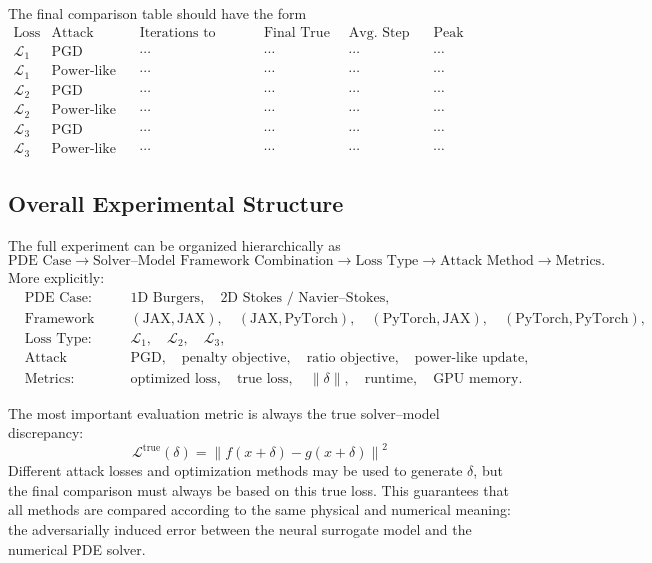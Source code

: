 \documentclass{article}
\begin{document}
The final comparison table should have the form
\[
\begin{array}{c|c|c|c|c|c}
\text{Loss}
&
\text{Attack Method}
&
\text{Iterations to Threshold}
&
\text{Final True Loss}
&
\text{Avg. Step Time}
&
\text{Peak Memory}
\\
\hline
\mathcal{L}_1
&
\text{PGD}
&
\cdots
&
\cdots
&
\cdots
&
\cdots
\\
\mathcal{L}_1
&
\text{Power-like}
&
\cdots
&
\cdots
&
\cdots
&
\cdots
\\
\mathcal{L}_2
&
\text{PGD}
&
\cdots
&
\cdots
&
\cdots
&
\cdots
\\
\mathcal{L}_2
&
\text{Power-like}
&
\cdots
&
\cdots
&
\cdots
&
\cdots
\\
\mathcal{L}_3
&
\text{PGD}
&
\cdots
&
\cdots
&
\cdots
&
\cdots
\\
\mathcal{L}_3
&
\text{Power-like}
&
\cdots
&
\cdots
&
\cdots
&
\cdots
\end{array}
\]

\subsection{Overall Experimental Structure}

The full experiment can be organized hierarchically as
\[
\text{PDE Case}
\rightarrow
\text{Solver--Model Framework Combination}
\rightarrow
\text{Loss Type}
\rightarrow
\text{Attack Method}
\rightarrow
\text{Metrics}.
\]
More explicitly:
\[
\begin{aligned}
&\text{PDE Case:}
&&
\text{1D Burgers},\quad \text{2D Stokes / Navier--Stokes},
\\
&\text{Framework Combination:}
&&
(\text{JAX},\text{JAX}),\quad
(\text{JAX},\text{PyTorch}),\quad
(\text{PyTorch},\text{JAX}),\quad
(\text{PyTorch},\text{PyTorch}),
\\
&\text{Loss Type:}
&&
\mathcal{L}_1,\quad
\mathcal{L}_2,\quad
\mathcal{L}_3,
\\
&\text{Attack Method:}
&&
\text{PGD},\quad
\text{penalty objective},\quad
\text{ratio objective},\quad
\text{power-like update},
\\
&\text{Metrics:}
&&
\text{optimized loss},\quad
\text{true loss},\quad
\|\delta\|,\quad
\text{runtime},\quad
\text{GPU memory}.
\end{aligned}
\]

The most important evaluation metric is always the true solver--model discrepancy:
\[
\boxed{
\mathcal{L}^{\mathrm{true}}(\delta)
=
\left\|
f(x+\delta)-g(x+\delta)
\right\|^2
}
\]
Different attack losses and optimization methods may be used to generate \(\delta\), but the final comparison must always be based on this true loss. This guarantees that all methods are compared according to the same physical and numerical meaning: the adversarially induced error between the neural surrogate model and the numerical PDE solver.
\end{document}
